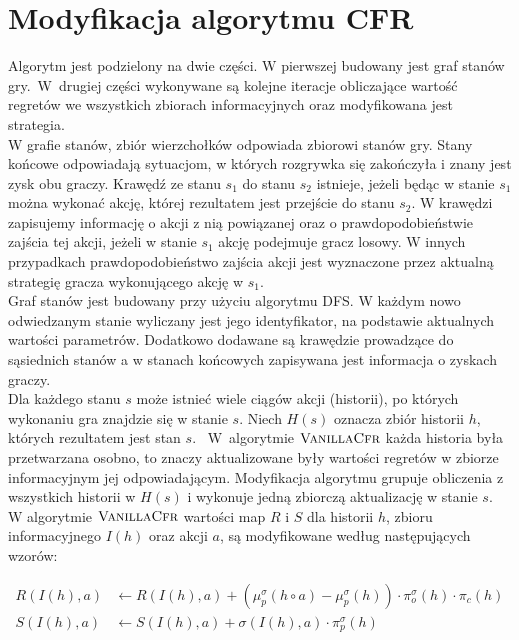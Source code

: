 \documentclass[magisterska]{pracamgr}
\begin{document}
\section{Modyfikacja algorytmu CFR}

\noindent
Algorytm jest podzielony na dwie części. W pierwszej budowany jest graf stanów gry.~W~drugiej części
wykonywane są kolejne iteracje obliczające wartość regretów we wszystkich zbiorach informacyjnych oraz
modyfikowana jest strategia. \\

\noindent
W grafie stanów, zbiór wierzchołków odpowiada zbiorowi stanów gry. Stany końcowe odpowiadają
sytuacjom, w których rozgrywka się zakończyła i znany jest zysk obu graczy. Krawędź ze stanu $s_1$ do stanu $s_2$
istnieje, jeżeli będąc w stanie $s_1$ można wykonać akcję, której rezultatem jest przejście do stanu
$s_2$. W krawędzi zapisujemy informację o akcji z nią powiązanej oraz o prawdopodobieństwie zajścia
tej akcji, jeżeli w stanie $s_1$ akcję podejmuje gracz losowy. W innych przypadkach prawdopodobieństwo
zajścia akcji jest wyznaczone przez aktualną strategię gracza wykonującego akcję w $s_1$. \\

\noindent
Graf stanów jest budowany przy użyciu algorytmu DFS. W każdym nowo odwiedzanym stanie
wyliczany jest jego identyfikator, na podstawie aktualnych wartości parametrów. Dodatkowo dodawane
są krawędzie prowadzące do sąsiednich stanów a w stanach końcowych zapisywana jest informacja o
zyskach graczy. \\

\noindent
Dla każdego stanu $s$ może istnieć wiele ciągów akcji (historii), po których wykonaniu gra
znajdzie się w stanie $s$. Niech $H(s)$ oznacza zbiór historii $h$, których rezultatem jest stan $s$.
~W~algorytmie $\Call{VanillaCfr}{}$ każda historia była przetwarzana osobno, to znaczy aktualizowane były wartości
regretów w zbiorze informacyjnym jej odpowiadającym. Modyfikacja algorytmu grupuje obliczenia z
wszystkich historii w $H(s)$ i wykonuje jedną zbiorczą aktualizację w stanie $s$. \\

\noindent
W algorytmie $\Call{VanillaCfr}{}$ wartości map $R$ i $S$ dla historii $h$, zbioru informacyjnego $I(h)$ oraz akcji $a$, są modyfikowane
według następujących wzorów:

\begin{align*}
R(I(h), a) &\leftarrow R(I(h), a) + (\mu_p^{\sigma}(h \circ a) - \mu_p^{\sigma}(h)) \cdot \pi_{o}^{\sigma}(h) \cdot \pi_c(h) \\
S(I(h), a) &\leftarrow S(I(h), a) + \sigma(I(h), a) \cdot \pi_p^{\sigma}(h)
\end{align*}
\end{document}
